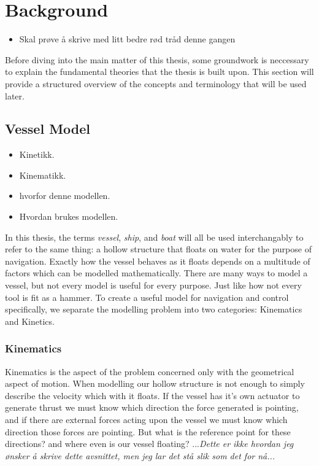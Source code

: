 \section{Background}
\begin{itemize}
    \item Skal prøve å skrive med litt bedre rød tråd denne gangen
\end{itemize}
Before diving into the main matter of this thesis, some groundwork is neccessary to explain the fundamental theories that the thesis is built upon.
This section will provide a structured overview of the concepts and terminology that will be used later.

\subsection{Vessel Model}
\begin{itemize}
    \item Kinetikk.
    \item Kinematikk.
    \item hvorfor denne modellen.
    \item Hvordan brukes modellen. 
\end{itemize}

In this thesis, the terms \textit{vessel}, \textit{ship}, and \textit{boat} will all be used interchangably to refer to the same thing: a hollow structure that floats
on water for the purpose of navigation. Exactly how the vessel behaves as it floats depends on a multitude of factors which can be modelled mathematically. There are many
ways to model a vessel, but not every model is useful for every purpose. Just like how not every tool is fit as a hammer. To create a useful model for
navigation and control specifically, we separate the modelling problem into two categories: Kinematics and Kinetics.

\subsubsection{Kinematics}
Kinematics is the aspect of the problem concerned only with the geometrical aspect of motion. When modelling our hollow structure is not enough to simply 
describe the velocity which with it floats. If the vessel has it's own actuator to generate thrust we must know which direction the force generated is pointing, and
if there are external forces acting upon the vessel we must know which direction those forces are pointing. But what is the reference point for these directions? and where
even is our vessel floating?   ...\textit{Dette er ikke hvordan jeg ønsker å skrive dette avsnittet, men jeg lar det stå slik som det for nå...}


